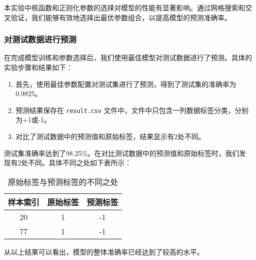 \documentclass[12pt]{article}
\begin{document}
本实验中核函数和正则化参数的选择对模型的性能有显著影响。通过网格搜索和交叉验证，我们能够有效地选择出最优参数组合，以提高模型的预测准确率。
\subsubsection{对测试数据进行预测}

在完成模型训练和参数选择后，我们使用最佳模型对测试数据进行了预测。具体的实验步骤和结果如下：

\begin{enumerate}
  \item 首先，使用最佳参数配置对测试集进行了预测，得到了测试集的准确率为0.9825。
  \item 预测结果保存在 \texttt{result.csv} 文件中，文件中只包含一列数据标签分类，分别为+1或-1。
  \item 对比了测试数据中的预测值和原始标签，结果显示有2处不同。
\end{enumerate}




测试集准确率达到了98.25\%。在对比测试数据中的预测值和原始标签时，我们发现有2处不同。具体不同之处如下表所示：

\begin{table}[h]
  \centering
  \begin{tabular}{ccc}
    \toprule
    样本索引 & 原始标签 & 预测标签 \\
    \midrule
    20   & 1    & -1   \\
    77   & 1    & -1   \\
    \bottomrule
  \end{tabular}
  \caption{原始标签与预测标签的不同之处}
\end{table}

从以上结果可以看出，模型的整体准确率已经达到了较高的水平。
\end{document}
